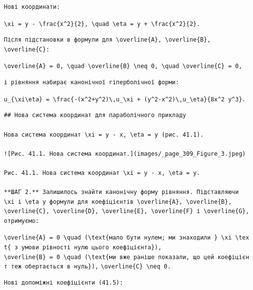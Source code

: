 \documentclass[
  ukrainian,
]{article}
\begin{document}
\begin{verbatim}
Нові координати:
\end{verbatim}

\texttt{\textbackslash{}xi\ =\ y\ -\ \textbackslash{}frac\{x\^{}2\}\{2\},\ \textbackslash{}quad\ \textbackslash{}eta\ =\ y\ +\ \textbackslash{}frac\{x\^{}2\}\{2\}.}

\begin{verbatim}
Після підстановки в формули для \overline{A}, \overline{B}, \overline{C}:
\end{verbatim}

\texttt{\textbackslash{}overline\{A\}\ =\ 0,\ \textbackslash{}quad\ \textbackslash{}overline\{B\}\ \textbackslash{}neq\ 0,\ \textbackslash{}quad\ \textbackslash{}overline\{C\}\ =\ 0,}

\begin{verbatim}
і рівняння набирає канонічної гіперболічної форми:
\end{verbatim}

\texttt{u\_\{\textbackslash{}xi\textbackslash{}eta\}\ =\ \textbackslash{}frac\{-(x\^{}2+y\^{}2)\textbackslash{},u\_\textbackslash{}xi\ +\ (y\^{}2-x\^{}2)\textbackslash{},u\_\textbackslash{}eta\}\{8x\^{}2\ y\^{}3\}.}

\begin{verbatim}
## Нова система координат для параболічного прикладу

Нова система координат \xi = y - x, \eta = y (рис. 41.1).

![Рис. 41.1. Нова система координат.](images/_page_309_Figure_3.jpeg)

Рис. 41.1. Нова система координат \xi = y - x, \eta = y.

**ШАГ 2.** Залишилось знайти канонічну форму рівняння. Підставляючи \xi і \eta у формули для коефіцієнтів \overline{A}, \overline{B}, \overline{C}, \overline{D}, \overline{E}, \overline{F} і \overline{G}, отримуємо:
\end{verbatim}

\texttt{\textbackslash{}overline\{A\}\ =\ 0\ \textbackslash{}quad\ (\textbackslash{}text\{мало\ бути\ нулем;\ ми\ знаходили\ \}\ \textbackslash{}xi\ \textbackslash{}text\{\ з\ умови\ рівності\ нулю\ цього\ коефіцієнта\}),}
\texttt{\textbackslash{}overline\{B\}\ =\ 0\ \textbackslash{}quad\ (\textbackslash{}text\{ми\ вже\ раніше\ показали,\ що\ цей\ коефіцієнт\ теж\ обертається\ в\ нуль\}),}
\texttt{\textbackslash{}overline\{C\}\ \textbackslash{}neq\ 0.}

\begin{verbatim}
Нові допоміжні коефіцієнти (41.5):
\end{verbatim}
\end{document}
